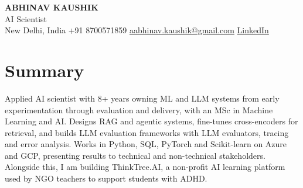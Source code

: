 \documentclass[10pt,a4paper]{article}
\begin{document}
\begin{center}
  {\LARGE\bfseries ABHINAV KAUSHIK}\\[2pt]
  {\large AI Scientist}\\[2pt]
  New Delhi, India \textbar{} +91 8700571859 \textbar{} \href{mailto:aabhinav.kaushik@gmail.com}{aabhinav.kaushik@gmail.com} \textbar{} \href{https://www.linkedin.com/in/abhinav-kaushik10/}{LinkedIn}  
\end{center}

\section{Summary}
Applied AI scientist with 8+ years owning ML and LLM systems from early experimentation through evaluation and delivery, with an MSc in Machine Learning and AI. Designs RAG and agentic systems, fine-tunes cross-encoders for retrieval, and builds LLM evaluation frameworks with LLM evaluators, tracing and error analysis. Works in Python, SQL, PyTorch and Scikit-learn on Azure and GCP, presenting results to technical and non-technical stakeholders. Alongside this, I am building ThinkTree.AI, a non-profit AI learning platform used by NGO teachers to support students with ADHD.
\end{document}
